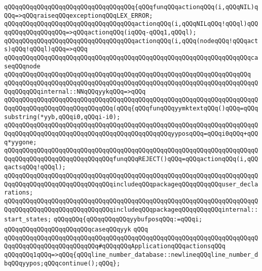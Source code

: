 \verb|qQQqqQQqqQQqqQQqqQQqqQQqqQQqqQQqqQQq{qQQqfunqQQqactionqQQq(i,qQQqNIL)qQQq=>qQQqraiseqQQqexceptionqQQqLEX_ERROR;|\newline
\verb|qQQqqQQqqQQqqQQqqQQqqQQqqQQqqQQqqQQqactionqQQq(i,qQQqNILqQQq!qQQql)qQQqqQQqqQQqqQQqqQQq=>qQQqactionqQQq(iqQQq-qQQq1,qQQql);|\newline
\verb|qQQqqQQqqQQqqQQqqQQqqQQqqQQqqQQqqQQqactionqQQq(i,qQQq(nodeqQQq!qQQqacts)qQQq!qQQql)qQQq=>qQQq|\newline
\verb|qQQqqQQqqQQqqQQqqQQqqQQqqQQqqQQqqQQqqQQqqQQqqQQqqQQqqQQqqQQqqQQqqQQqcaseqQQqnode|\newline
\verb|qQQqqQQqqQQqqQQqqQQqqQQqqQQqqQQqqQQqqQQqqQQqqQQqqQQqqQQqqQQqqQQqqQQq|\newline
\verb|qQQqqQQqqQQqqQQqqQQqqQQqqQQqqQQqqQQqqQQqqQQqqQQqqQQqqQQqqQQqqQQqqQQqqQQqqQQqqQQqinternal::NNqQQqyykqQQq=>qQQq|\newline
\verb|qQQqqQQqqQQqqQQqqQQqqQQqqQQqqQQqqQQqqQQqqQQqqQQqqQQqqQQqqQQqqQQqqQQqqQQqqQQqqQQqqQQqqQQqqQQqqQQqqQQq(qQQq{qQQqfunqQQqyymktextqQQq()qQQq=qQQqsubstring(*yyb,qQQqi0,qQQqi-i0);|\newline
\verb|qQQqqQQqqQQqqQQqqQQqqQQqqQQqqQQqqQQqqQQqqQQqqQQqqQQqqQQqqQQqqQQqqQQqqQQqqQQqqQQqqQQqqQQqqQQqqQQqqQQqqQQqqQQqqQQqqQQqyyposqQQq=qQQqi0qQQq+qQQq*yygone;|\newline
\verb|qQQqqQQqqQQqqQQqqQQqqQQqqQQqqQQqqQQqqQQqqQQqqQQqqQQqqQQqqQQqqQQqqQQqqQQqqQQqqQQqqQQqqQQqqQQqqQQqqQQqfunqQQqREJECT()qQQq=qQQqactionqQQq(i,qQQqactsqQQq!qQQql);|\newline
\verb|qQQqqQQqqQQqqQQqqQQqqQQqqQQqqQQqqQQqqQQqqQQqqQQqqQQqqQQqqQQqqQQqqQQqqQQqqQQqqQQqqQQqqQQqqQQqqQQqqQQqincludeqQQqpackageqQQqqQQqqQQquser_declarations;|\newline
\verb|qQQqqQQqqQQqqQQqqQQqqQQqqQQqqQQqqQQqqQQqqQQqqQQqqQQqqQQqqQQqqQQqqQQqqQQqqQQqqQQqqQQqqQQqqQQqqQQqqQQqincludeqQQqpackageqQQqqQQqqQQqinternal::start_states;|\newline
\verb|qQQqqQQq{qQQqqQQqqQQqyybufposqQQq:=qQQqi;|\newline
\verb|qQQqqQQqqQQqqQQqqQQqqQQqcaseqQQqyyk|\newline
\verb|qQQq|\newline
\newline
\verb|qQQqqQQqqQQqqQQqqQQqqQQqqQQqqQQqqQQqqQQqqQQqqQQqqQQqqQQqqQQqqQQqqQQqqQQqqQQqqQQqqQQqqQQqqQQqqQQq#qQQqqQQqApplicationqQQqactionsqQQq|\newline
\newline
\verb|qQQqqQQq1qQQq=>qQQq{qQQqline_number_database::newlineqQQqline_number_dbqQQqyypos;qQQqcontinue();qQQq};|\newline

